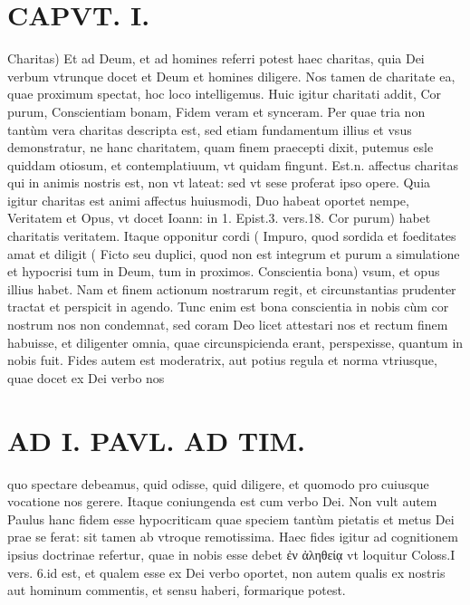 \documentclass{article}
\begin{document}
\begin{pages}
\section*{CAPVT. I. }
\marginpar{[ p.15 ]}\pstart Charitas) Et ad Deum, et ad homines referri potest haec charitas, quia Dei verbum vtrunque docet et Deum et homines diligere. Nos tamen de charitate ea, quae proximum spectat, hoc loco intelligemus.  \pend\pstart Huic igitur charitati addit, Cor purum, Conscientiam bonam, Fidem veram et synceram. Per quae tria non tantùm vera charitas descripta est, sed etiam fundamentum illius et vsus demonstratur, ne hanc charitatem, quam finem praecepti dixit, putemus esle quiddam otiosum, et contemplatiuum, vt quidam fingunt. Est.n. affectus charitas qui in animis nostris est, non vt lateat: sed vt sese proferat ipso opere.  \pend\pstart Quia igitur charitas est animi affectus huiusmodi, Duo habeat oportet nempe, Veritatem et Opus, vt docet Ioann: in 1. Epist.3. vers.18. Cor purum) habet charitatis veritatem. Itaque opponitur cordi ( Impuro, quod sordida et foeditates amat et diligit ( Ficto seu duplici, quod non est integrum et purum a simulatione et hypocrisi tum in Deum, tum in proximos.  \pend\pstart Conscientia bona) vsum, et opus illius habet. Nam et finem actionum nostrarum regit, et circunstantias prudenter tractat et perspicit in agendo. Tunc enim est bona conscientia in nobis cùm cor nostrum nos non condemnat, sed coram Deo licet attestari nos et rectum finem habuisse, et diligenter omnia, quae circunspicienda erant, perspexisse, quantum in nobis fuit.  \pend\pstart Fides autem est moderatrix, aut potius regula et norma vtriusque, quae docet ex Dei verbo nos  \pend
\section*{AD I. PAVL. AD TIM. }
\marginpar{[ p.16 ]}\pstart quo spectare debeamus, quid odisse, quid diligere, et quomodo pro cuiusque vocatione nos gerere. Itaque coniungenda est cum verbo Dei. Non vult autem Paulus hanc fidem esse hypocriticam quae speciem tantùm pietatis et metus Dei prae se ferat: sit tamen ab vtroque remotissima.  \pend\pstart Haec fides igitur ad cognitionem ipsius doctrinae refertur, quae in nobis esse debet ἐν ἀληθείᾳ vt loquitur Coloss.I vers. 6.id est, et qualem esse ex Dei verbo oportet, non autem qualis ex nostris aut hominum commentis, et sensu haberi, formarique potest.  \pend
{}
{}

\end{pages}
\end{document}
